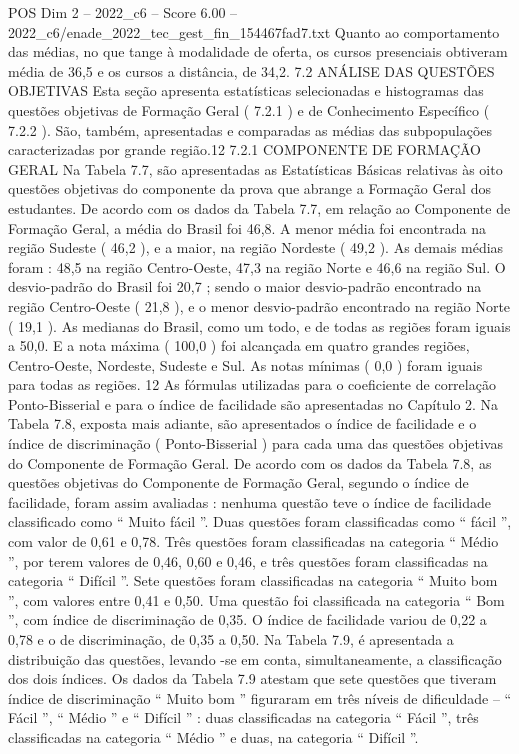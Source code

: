 \begin{textsample}{POS Dim 2 – 2022\_c6 – Score 6.00 – 2022\_c6/enade\_2022\_tec\_gest\_fin\_154467fad7.txt}
Quanto ao comportamento das médias, no que tange à modalidade de oferta, os cursos presenciais obtiveram média de 36,5 e os cursos a distância, de 34,2. 7.2 ANÁLISE DAS QUESTÕES OBJETIVAS Esta seção apresenta estatísticas selecionadas e histogramas das questões objetivas de Formação Geral ( 7.2.1 ) e de Conhecimento Específico ( 7.2.2 ).
São, também, apresentadas e comparadas as médias das subpopulações caracterizadas por grande região.12 7.2.1 COMPONENTE DE FORMAÇÃO GERAL Na Tabela 7.7, são apresentadas as Estatísticas Básicas relativas às oito questões objetivas do componente da prova que abrange a Formação Geral dos estudantes.
De acordo com os dados da Tabela 7.7, em relação ao Componente de Formação Geral, a média do Brasil foi 46,8.
A menor média foi encontrada na região Sudeste ( 46,2 ), e a maior, na região Nordeste ( 49,2 ).
As demais médias foram : 48,5 na região Centro-Oeste, 47,3 na região Norte e 46,6 na região Sul.
O desvio-padrão do Brasil foi 20,7 ; sendo o maior desvio-padrão encontrado na região Centro-Oeste ( 21,8 ), e o menor desvio-padrão encontrado na região Norte ( 19,1 ).
As medianas do Brasil, como um todo, e de todas as regiões foram iguais a 50,0.
E a nota máxima ( 100,0 ) foi alcançada em quatro grandes regiões, Centro-Oeste, Nordeste, Sudeste e Sul.
As notas mínimas ( 0,0 ) foram iguais para todas as regiões. 12 As fórmulas utilizadas para o coeficiente de correlação Ponto-Bisserial e para o índice de facilidade são apresentadas no Capítulo 2.
Na Tabela 7.8, exposta mais adiante, são apresentados o índice de facilidade e o índice de discriminação ( Ponto-Bisserial ) para cada uma das questões objetivas do Componente de Formação Geral.
De acordo com os dados da Tabela 7.8, as questões objetivas do Componente de Formação Geral, segundo o índice de facilidade, foram assim avaliadas : nenhuma questão teve o índice de facilidade classificado como “ Muito fácil ”.
Duas questões foram classificadas como “ fácil ”, com valor de 0,61 e 0,78.
Três questões foram classificadas na categoria “ Médio ”, por terem valores de 0,46, 0,60 e 0,46, e três questões foram classificadas na categoria “ Difícil ”.
Sete questões foram classificadas na categoria “ Muito bom ”, com valores entre 0,41 e 0,50.
Uma questão foi classificada na categoria “ Bom ”, com índice de discriminação de 0,35.
O índice de facilidade variou de 0,22 a 0,78 e o de discriminação, de 0,35 a 0,50.
Na Tabela 7.9, é apresentada a distribuição das questões, levando -se em conta, simultaneamente, a classificação dos dois índices.
Os dados da Tabela 7.9 atestam que sete questões que tiveram índice de discriminação “ Muito bom ” figuraram em três níveis de dificuldade – “ Fácil ”, “ Médio ” e “ Difícil ” : duas classificadas na categoria “ Fácil ”, três classificadas na categoria “ Médio ” e duas, na categoria “ Difícil ”.

\end{textsample}
